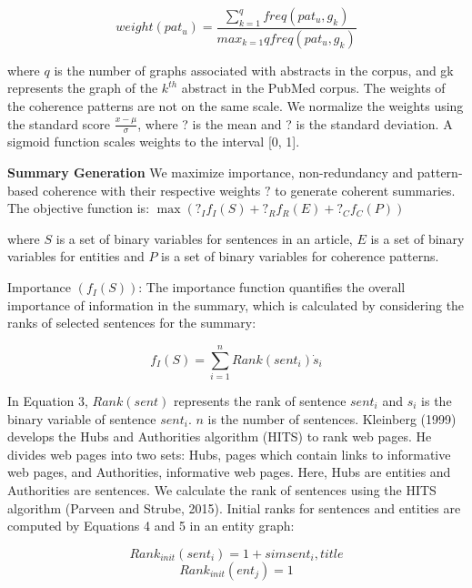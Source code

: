 \begin{equation}
weight(pat_u) = \frac{\sum_{k=1}^{q}{freq(pat_u,g_k)}}{max_{k=1}{q}{freq(pat_u,g_k)}}
\end{equation}

where $q$ is the number of graphs associated with abstracts in the corpus, and gk represents the graph of the $k^{th}$ abstract in the PubMed corpus.
The weights of the coherence patterns are not on the same scale. 
We normalize the weights using the standard score  $\frac{x-\mu}{\sigma}$, where ? is the mean and ? is the standard deviation. 
A sigmoid function scales weights to the interval [0, 1].


\textbf{Summary Generation}
We maximize importance, non-redundancy and pattern-based coherence with their respective weights $?$ to generate coherent summaries. 
The objective function is:
$\max(?_I f_I(S) + ?_Rf_R(E) + ?_C f_C(P ))$

where $S$ is a set of binary variables for sentences in an article, $E$ is a set of binary variables for entities and $P$ is a set of binary variables for coherence patterns.

Importance $(f_I(S))$: The importance function quantifies the overall importance of information in the summary, which is calculated by considering the ranks of selected sentences for the summary:

\begin{equation}
f_I(S) = \sum_{i=1}^{n}{Rank(sent_i) \dot s_i}
\end{equation}

In Equation 3, $Rank(sent)$ represents the rank of sentence $sent_i$ and $s_i$ is the binary variable of sentence $sent_i$. $n$ is the number of sentences. 
Kleinberg (1999) develops the Hubs and Authorities algorithm (HITS) to rank web pages. 
He divides web pages into two sets: Hubs, pages which contain links to informative web pages, and Authorities, informative web pages. Here, Hubs are entities and Authorities are sentences. 
We calculate the rank of sentences using the HITS algorithm (Parveen and Strube, 2015). 
Initial ranks for sentences and entities are computed by Equations 4 and 5 in an entity graph:

\begin{equation}
Rank_{init}(sent_i)= 1+ sim{sent_i,title}
\end{equation}
\begin{equation}
Rank_{init}(ent_j)= 1
\end{equation}

